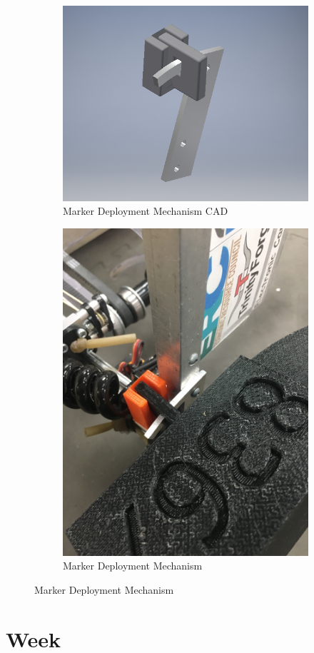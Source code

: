 \documentclass{article}
\begin{document}
\begin{figure}[h!]
\centering
\begin{subfigure}{.45\textwidth}
  \centering
  \includegraphics[width=1\textwidth]{29_03-18/images/marker.png}
  \caption{Marker Deployment Mechanism CAD}
  \label{fig:MDM}
 \end{subfigure}
\begin{subfigure}{.45\textwidth}
  \centering
  \includegraphics[width=.75\textwidth]{29_03-18/images/thing.jpg}
  \caption{Marker Deployment Mechanism}
  \label{fig:hub}
  \end{subfigure}
  \caption{Marker Deployment Mechanism}
  \end{figure}
\clearpage \newpage \section{Week \thesection} 
\end{document}
